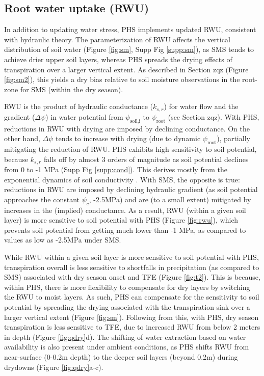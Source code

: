 \documentclass[draft,linenumbers]{agujournal}
\begin{document}
\subsection{Root water uptake (RWU)}

In addition to updating water stress, PHS implements updated RWU, consistent with hydraulic theory.
The parameterization of RWU affects the vertical distribution of soil water (Figure \ref{fig:sm}, Supp Fig \ref{supp:sm}), as
SMS tends to achieve drier upper soil layers, whereas PHS spreads the drying effects of transpiration over a larger vertical extent.
As described in Section zqz (Figure \ref{fig:sm2}), this yields a dry bias relative to soil moisture observations in the root-zone for SMS (within the dry season).

RWU is the product of hydraulic conductance ($k_{s,r}$) for water flow and the gradient ($\Delta\psi$) in water potential from $\psi_{\text{soil,i}}$ to $\psi_\text{root}$ (see Section zqz).
With PHS, reductions in RWU with drying are imposed by declining conductance.
On the other hand, $\Delta\psi$ tends to increase with drying (due to dynamic $\psi_{\text{root}}$), partially mitigating the reduction of RWU.
PHS exhibits high sensitivity to soil potential, because $k_{s,r}$ falls off by almost 3 orders of magnitude as soil potential declines from 0 to -1 MPa (Supp Fig \ref{supp:cond}).
This derives mostly from the exponential dynamics of soil conductivity \citep{brooks1964}.
With SMS, the opposite is true: reductions in RWU are imposed by declining hydraulic gradient (as soil potential approaches the constant $\psi_c$, -2.5MPa) and are (to a small extent) mitigated by increases in the (implied) conductance. 
As a result, RWU (within a given soil layer) is more sensitive to soil potential with PHS (Figure \ref{fig:rwu}), which prevents soil potential from getting much lower than -1 MPa, as compared to values as low as -2.5MPa under SMS.

While RWU within a given soil layer is more sensitive to soil potential with PHS, transpiration overall is less sensitive to shortfalls in precipitation (as compared to SMS)
associated with dry season onset and TFE (Figure \ref{fig:t2}).
This is because, within PHS, there is more flexibility to compensate for dry layers by switching the RWU to moist layers.
As such, PHS can compensate for the sensitivity to soil potential by spreading the drying associated with the transpiration sink over a larger vertical extent (Figure \ref{fig:sm}).
Following from this, with PHS, dry season transpiration is less sensitive to TFE, due to increased RWU from below 2 meters in depth (Figure \ref{fig:qdry}d).
The shifting of water extraction based on water availability is also present under ambient conditions, as PHS shifts RWU from near-surface (0-0.2m depth) to the deeper soil layers (beyond 0.2m) during drydowns (Figure \ref{fig:qdry}a-c).
\end{document}
